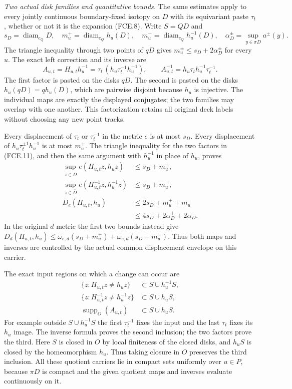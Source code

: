 \documentclass[11pt,a4paper]{article}
\begin{document}
\emph{Two actual disk families and quantitative bounds.}
The same estimates apply to every jointly continuous
boundary-fixed isotopy on $D$ with its equivariant paste
$\tau_t$, whether or not it is the expansion (FCE.8).
Write $S=QD$ and
\[
 s_D=\operatorname{diam}_{e_Q}D,\quad
 m_u^+=\operatorname{diam}_{e_Q}h_u(D),\quad
 m_u^-=\operatorname{diam}_{e_Q}h_u^{-1}(D),\quad
 \alpha_D^\pm=\sup_{y\in\pi D}a^\pm(y).
                                                               \tag{FCE.10}
\]
The triangle inequality through two points of $qD$ gives
$m_u^\pm\leq s_D+2\alpha_D^\pm$ for every $u$.
The exact left correction and its inverse are
\[
 A_{u,t}=H_{u,t}h_u^{-1}
       =\tau_t\,(h_u\tau_t^{-1}h_u^{-1}),\qquad
 A_{u,t}^{-1}=h_u\tau_t h_u^{-1}\tau_t^{-1}.
                                                               \tag{FCE.11}
\]
The first factor is pasted on the disks $qD$.
The second is pasted on the disks
$h_u(qD)=qh_u(D)$, which are pairwise disjoint because
$h_u$ is injective. The individual maps are exactly the
displayed conjugates; the two families may overlap with
one another. This factorization retains all original deck
labels without choosing any new point tracks.

Every displacement of $\tau_t$ or $\tau_t^{-1}$ in the
metric $e$ is at most $s_D$. Every displacement of
$h_u\tau_t^{\pm1}h_u^{-1}$ is at most $m_u^+$.
The triangle inequality for the two factors in (FCE.11),
and then the same argument with $h_u^{-1}$ in place of
$h_u$, proves
\[
 \begin{aligned}
 \sup_{z\in\overline D}e(H_{u,t}z,h_uz)&\leq s_D+m_u^+,\\
 \sup_{z\in\overline D}e(H_{u,t}^{-1}z,h_u^{-1}z)&\leq s_D+m_u^-,\\
 D_e(H_{u,t},h_u)&\leq2s_D+m_u^++m_u^-\\
                 &\leq4s_D+2\alpha_D^++2\alpha_D^-.
 \end{aligned}                                                 \tag{FCE.12}
\]
In the original $d$ metric the first two bounds instead give
$D_d(H_{u,t},h_u)\leq
\omega_{e,d}(s_D+m_u^+)+\omega_{e,d}(s_D+m_u^-)$.
Thus both maps and inverses are controlled by the actual
common displacement envelope on this carrier.

The exact input regions on which a change can occur are
\[
 \begin{aligned}
 \{z:H_{u,t}z\ne h_uz\}&\subset S\cup h_u^{-1}S,\\
 \{z:H_{u,t}^{-1}z\ne h_u^{-1}z\}&\subset S\cup h_uS,\\
 \operatorname{supp}_O(A_{u,t})&\subset S\cup h_uS.
 \end{aligned}                                                 \tag{FCE.13}
\]
For example outside $S\cup h_u^{-1}S$ the first
$\tau_t^{-1}$ fixes the input and the last $\tau_t$
fixes its $h_u$ image. The inverse formula proves the
second inclusion; the two factors prove the third.
Here $S$ is closed in $O$ by local finiteness of the
closed disks, and $h_uS$ is closed by the homeomorphism
$h_u$. Thus taking closure in $O$ preserves the third
inclusion.
All these quotient carriers lie in compact sets uniformly
over $u\in P$, because $\pi D$ is compact and the given
quotient maps and inverses evaluate continuously on it.
\end{document}
